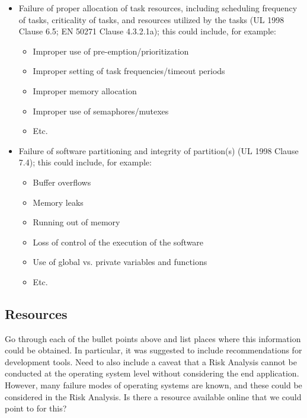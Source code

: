 \documentclass[12pt]{../Common_files/ElisaPaper}
\begin{document}
\begin{itemize}

\item Failure of proper allocation of task resources, including scheduling frequency of tasks, criticality of tasks, and resources utilized by the tasks (UL 1998 \cite{UL1998}  Clause 6.5; EN 50271 \cite{EN50271} Clause 4.3.2.1a); this could include, for example:

\begin{itemize}

\item Improper use of pre-emption/prioritization
\item Improper setting of task frequencies/timeout periods
\item Improper memory allocation
\item Improper use of semaphores/mutexes
\item Etc.

\end{itemize}

\item Failure of software partitioning and integrity of partition(s) (UL 1998 \cite{UL1998} Clause 7.4); this could include, for example:

\begin{itemize}

\item Buffer overflows
\item Memory leaks
\item Running out of memory
\item Loss of control of the execution of the software
\item Use of global vs. private variables and functions
\item Etc.

\end{itemize}

\end{itemize}

\subsection{Resources}
Go through each of the bullet points above and list places where this information could be obtained.  In particular, it was suggested to include recommendations for development tools.  Need to also include a caveat that a Risk Analysis cannot be conducted at the operating system level without considering the end application.  However, many failure modes of operating systems are known, and these could be considered in the Risk Analysis.  Is there a resource available online that we could point to for this?
\end{document}
